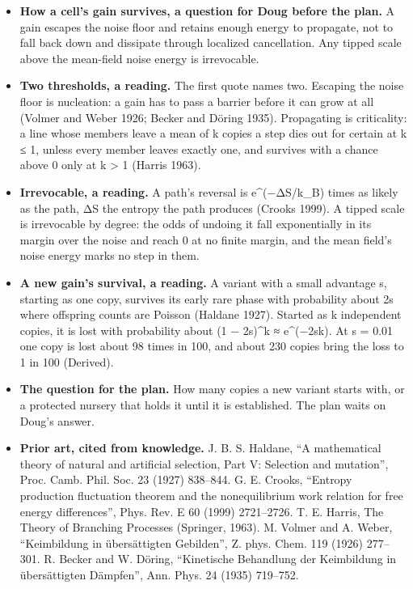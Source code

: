 \begin{enumerate}
\begin{itemize}
\begin{enumerate}
\begin{itemize}
\item \textbf{How a cell's gain survives, a question for Doug before the plan.} A gain escapes the noise floor and retains enough energy to propagate, not to fall back down and dissipate through localized cancellation. Any tipped scale above the mean-field noise energy is irrevocable.
\item \textbf{Two thresholds, a reading.} The first quote names two. Escaping the noise floor is nucleation: a gain has to pass a barrier before it can grow at all (Volmer and Weber 1926; Becker and Döring 1935). Propagating is criticality: a line whose members leave a mean of k copies a step dies out for certain at k ≤ 1, unless every member leaves exactly one, and survives with a chance above 0 only at k > 1 (Harris 1963).
\item \textbf{Irrevocable, a reading.} A path's reversal is e\textasciicircum{}(−ΔS/k\_\allowbreak{}B) times as likely as the path, ΔS the entropy the path produces (Crooks 1999). A tipped scale is irrevocable by degree: the odds of undoing it fall exponentially in its margin over the noise and reach 0 at no finite margin, and the mean field's noise energy marks no step in them.
\item \textbf{A new gain's survival, a reading.} A variant with a small advantage s, starting as one copy, survives its early rare phase with probability about 2s where offspring counts are Poisson (Haldane 1927). Started as k independent copies, it is lost with probability about (1 − 2s)\textasciicircum{}k ≈ e\textasciicircum{}(−2sk). At s = 0.01 one copy is lost about 98 times in 100, and about 230 copies bring the loss to 1 in 100 (Derived).
\item \textbf{The question for the plan.} How many copies a new variant starts with, or a protected nursery that holds it until it is established. The plan waits on Doug's answer.
\item \textbf{Prior art, cited from knowledge.} J. B. S. Haldane, “A mathematical theory of natural and artificial selection, Part V: Selection and mutation”, Proc. Camb. Phil. Soc. 23 (1927) 838–844. G. E. Crooks, “Entropy production fluctuation theorem and the nonequilibrium work relation for free energy differences”, Phys. Rev. E 60 (1999) 2721–2726. T. E. Harris, The Theory of Branching Processes (Springer, 1963). M. Volmer and A. Weber, “Keimbildung in übersättigten Gebilden”, Z. phys. Chem. 119 (1926) 277–301. R. Becker and W. Döring, “Kinetische Behandlung der Keimbildung in übersättigten Dämpfen”, Ann. Phys. 24 (1935) 719–752.
\end{itemize}
\end{enumerate}


\end{itemize}
\end{enumerate}
